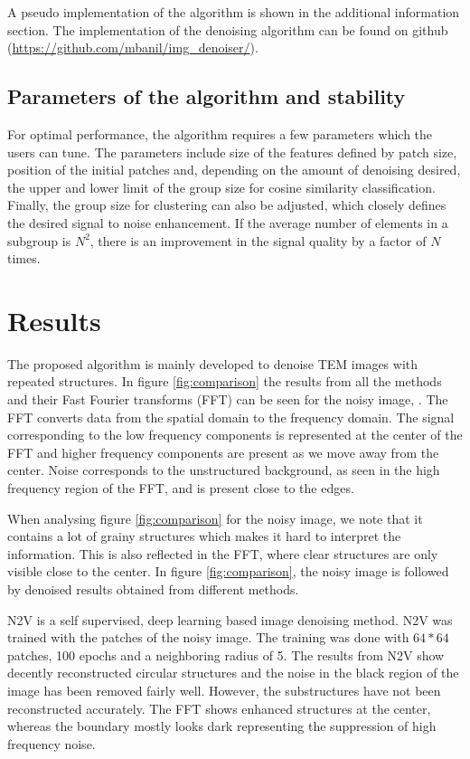 \documentclass[fleqn,10pt]{wlscirep}
\begin{document}
	A pseudo implementation of the algorithm is shown in the additional information section. The implementation of the denoising algorithm can be found on github (\url{https://github.com/mbanil/img_denoiser/}).
	
	\subsection*{Parameters of the algorithm and stability}
	
	For optimal performance, the algorithm requires a few parameters which the users can tune. The parameters include size of the features defined by patch size, position of the initial patches and, depending on the amount of denoising desired, the upper and lower limit of the group size for cosine similarity classification. Finally, the group size for clustering can also be adjusted, which closely defines the desired signal to noise enhancement. If the average number of elements in a subgroup is $N^2$, there is an improvement in the signal quality by a factor of $N$ times\cite{bcm_nlm}.
	
	\section*{Results}
	
	The proposed algorithm is mainly developed to denoise TEM images with repeated structures. In figure \ref{fig:comparison} the results from all the methods and their Fast Fourier transforms (FFT) can be seen for the noisy image, . The FFT converts data from the spatial domain to the frequency domain. The signal corresponding to the low frequency components is represented at the center of the FFT and higher frequency components are present as we move away from the center. Noise corresponds to the unstructured background, as seen in the high frequency region of the FFT, and is present close to the edges.
	
	When analysing figure \ref{fig:comparison} for the noisy image, we note that it contains a lot of grainy structures which makes it hard to interpret the information. This is also reflected in the FFT, where clear structures are only visible close to the center. In figure \ref{fig:comparison}, the noisy image is followed by denoised results obtained from different methods. 
	
	N2V\cite{krull2019noise2void} is a self supervised, deep learning based image denoising method. N2V was trained with the patches of the noisy image. The training was done with $64*64$ patches, 100 epochs and a neighboring radius of 5. The results from N2V show decently reconstructed circular structures and the noise in the black region of the image has been removed fairly well. However, the substructures have not been reconstructed accurately. The FFT shows enhanced structures at the center, whereas the boundary mostly looks dark representing the suppression of high frequency noise. 
		
\end{document}
